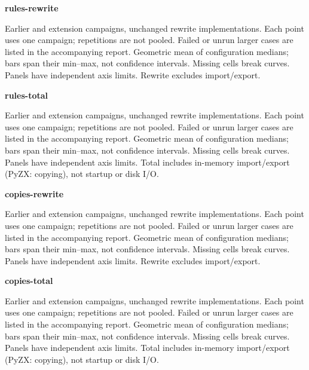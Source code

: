 \documentclass{article}
\begin{document}
\begin{center}
\textbf{rules-rewrite}\par\medskip

\end{center}
Earlier and extension campaigns, unchanged rewrite implementations. Each point uses one campaign; repetitions are not pooled. Failed or unrun larger cases are listed in the accompanying report. Geometric mean of configuration medians; bars span their min--max, not confidence intervals. Missing cells break curves. Panels have independent axis limits. Rewrite excludes import/export.
\clearpage
\begin{center}
\textbf{rules-total}\par\medskip

\end{center}
Earlier and extension campaigns, unchanged rewrite implementations. Each point uses one campaign; repetitions are not pooled. Failed or unrun larger cases are listed in the accompanying report. Geometric mean of configuration medians; bars span their min--max, not confidence intervals. Missing cells break curves. Panels have independent axis limits. Total includes in-memory import/export (PyZX: copying), not startup or disk I/O.
\clearpage
\begin{center}
\textbf{copies-rewrite}\par\medskip

\end{center}
Earlier and extension campaigns, unchanged rewrite implementations. Each point uses one campaign; repetitions are not pooled. Failed or unrun larger cases are listed in the accompanying report. Geometric mean of configuration medians; bars span their min--max, not confidence intervals. Missing cells break curves. Panels have independent axis limits. Rewrite excludes import/export.
\clearpage
\begin{center}
\textbf{copies-total}\par\medskip

\end{center}
Earlier and extension campaigns, unchanged rewrite implementations. Each point uses one campaign; repetitions are not pooled. Failed or unrun larger cases are listed in the accompanying report. Geometric mean of configuration medians; bars span their min--max, not confidence intervals. Missing cells break curves. Panels have independent axis limits. Total includes in-memory import/export (PyZX: copying), not startup or disk I/O.
\clearpage
\end{document}
